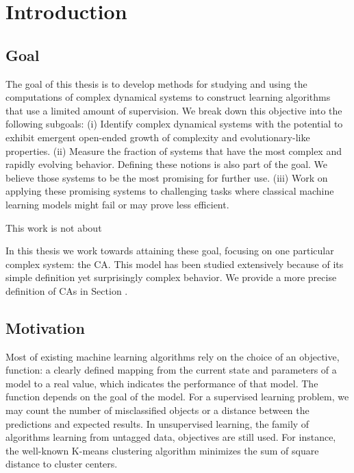 \chapter{Introduction}


\section{Goal}

The goal of this thesis is to develop methods for studying and using the
computations of complex dynamical systems to construct learning algorithms that
use a limited amount of supervision. We break down this objective into the
following subgoals: (i) Identify complex dynamical systems with the potential to
exhibit emergent open-ended growth of complexity and evolutionary-like
properties. (ii) Measure the fraction of systems that have the most complex and
rapidly evolving behavior. Defining these notions is also part of the goal. We
believe those systems to be the most promising for further use. (iii) Work on
applying these promising systems to challenging tasks where classical machine
learning models might fail or may prove less efficient.

This work is not about

In this thesis we work towards attaining these goal, focusing on one particular
complex system: the \acl{CA}. This model has been studied extensively
because of its simple definition yet surprisingly complex behavior. We provide a
more precise definition of \aclp{CA} in Section .


\section{Motivation}

Most of existing machine learning algorithms rely on the choice of an objective,
function: a clearly defined mapping from the current state and parameters of a
model to a real value, which indicates the performance of that model. The
function depends on the goal of the model. For a supervised learning problem, we
may count the number of misclassified objects or a distance between the
predictions and expected results. In unsupervised learning, the family of
algorithms learning from untagged data, objectives are still used. For instance,
the well-known K-means clustering algorithm minimizes the sum of square distance
to cluster centers.

